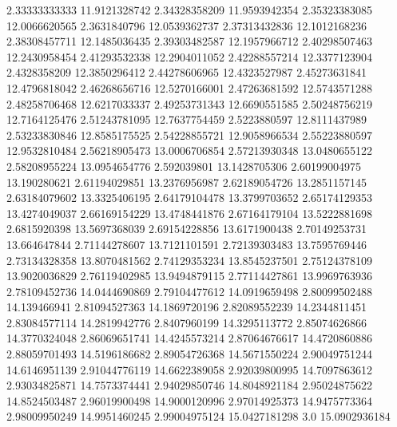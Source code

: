   2.33333333333    11.9121328742
  2.34328358209    11.9593942354
  2.35323383085    12.0066620565
   2.3631840796    12.0539362737
  2.37313432836    12.1012168236
  2.38308457711    12.1485036435
  2.39303482587    12.1957966712
  2.40298507463    12.2430958454
  2.41293532338    12.2904011052
  2.42288557214    12.3377123904
   2.4328358209    12.3850296412
  2.44278606965    12.4323527987
  2.45273631841    12.4796818042
  2.46268656716    12.5270166001
  2.47263681592    12.5743571288
  2.48258706468    12.6217033337
  2.49253731343    12.6690551585
  2.50248756219    12.7164125476
  2.51243781095    12.7637754459
   2.5223880597    12.8111437989
  2.53233830846    12.8585175525
  2.54228855721    12.9058966534
  2.55223880597    12.9532810484
  2.56218905473    13.0006706854
  2.57213930348    13.0480655122
  2.58208955224    13.0954654776
    2.592039801    13.1428705306
  2.60199004975     13.190280621
  2.61194029851    13.2376956987
  2.62189054726    13.2851157145
  2.63184079602    13.3325406195
  2.64179104478    13.3799703652
  2.65174129353    13.4274049037
  2.66169154229    13.4748441876
  2.67164179104    13.5222881698
   2.6815920398    13.5697368039
  2.69154228856    13.6171900438
  2.70149253731     13.664647844
  2.71144278607    13.7121101591
  2.72139303483    13.7595769446
  2.73134328358    13.8070481562
  2.74129353234    13.8545237501
  2.75124378109    13.9020036829
  2.76119402985    13.9494879115
  2.77114427861    13.9969763936
  2.78109452736    14.0444690869
  2.79104477612    14.0919659498
  2.80099502488     14.139466941
  2.81094527363    14.1869720196
  2.82089552239    14.2344811451
  2.83084577114    14.2819942776
   2.8407960199    14.3295113772
  2.85074626866    14.3770324048
  2.86069651741    14.4245573214
  2.87064676617    14.4720860886
  2.88059701493    14.5196186682
  2.89054726368    14.5671550224
  2.90049751244    14.6146951139
  2.91044776119    14.6622389058
  2.92039800995    14.7097863612
  2.93034825871    14.7573374441
  2.94029850746    14.8048921184
  2.95024875622    14.8524503487
  2.96019900498    14.9000120996
  2.97014925373    14.9475773364
  2.98009950249    14.9951460245
  2.99004975124    15.0427181298
            3.0    15.0902936184
